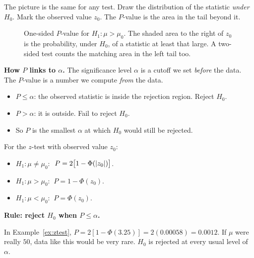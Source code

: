 The picture is the same for any test. Draw the distribution of the statistic \emph{under $H_0$}. Mark the observed value $z_0$. The $P$-value is the area in the tail beyond it.

\begin{figure}[h]
\centering
{}
\caption{One-sided $P$-value for $H_1:\mu>\mu_0$. The shaded area to the right of $z_0$ is the probability, under $H_0$, of a statistic at least that large. A two-sided test counts the matching area in the left tail too.}
\end{figure}

\textbf{How $P$ links to $\alpha$.} The significance level $\alpha$ is a cutoff we set \emph{before} the data. The $P$-value is a number we compute \emph{from} the data.
\begin{itemize}
  \item $P\le\alpha$: the observed statistic is inside the rejection region. Reject $H_0$.
  \item $P>\alpha$: it is outside. Fail to reject $H_0$.
  \item So $P$ is the smallest $\alpha$ at which $H_0$ would still be rejected.
\end{itemize}

For the $z$-test with observed value $z_0$:
\begin{itemize}
  \item $H_1:\mu\ne\mu_0$: $\ P=2\big[1-\Phi(\abs{z_0})\big]$.
  \item $H_1:\mu>\mu_0$: $\ P=1-\Phi(z_0)$.
  \item $H_1:\mu<\mu_0$: $\ P=\Phi(z_0)$.
\end{itemize}
\textbf{Rule: reject $H_0$ when $P\le\alpha$.}

\begin{example}
In Example~\ref{ex:ztest}, $P=2[1-\Phi(3.25)]=2(0.00058)=0.0012$. If $\mu$ were really $50$, data like this would be very rare. $H_0$ is rejected at every usual level of $\alpha$.
\end{example}

